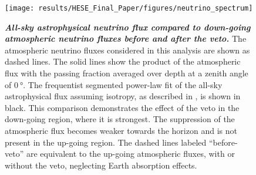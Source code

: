 \begin{figure}
	\centering
	\texttt{[image: results/HESE\_Final\_Paper/figures/neutrino\_spectrum]}
	\caption{\textbf{\textit{All-sky astrophysical neutrino flux compared to down-going atmospheric neutrino fluxes before and after the veto.}}
		The atmospheric neutrino fluxes considered in this analysis are shown as dashed lines.
		The solid lines show the product of the atmospheric flux with the passing fraction averaged over depth at a zenith angle of $\SI{0}\degree$.
		The frequentist segmented power-law fit of the all-sky astrophysical flux assuming isotropy, as described in , is shown in black.
		This comparison demonstrates the effect of the veto in the down-going region, where it is strongest.
		The suppression of the atmospheric flux becomes weaker towards the horizon and is not present in the up-going region.
		The dashed lines labeled ``before-veto'' are equivalent to the up-going atmospheric fluxes, with or without the veto, neglecting Earth absorption effects.}
	\label{fig:neutrino_spectrum}
\end{figure}

